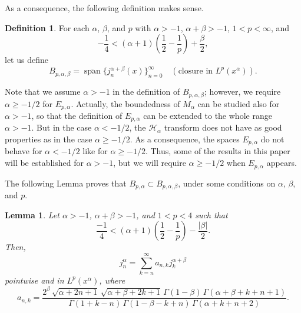 \documentclass[reqno]{amsart}
\theoremstyle{plain}
\newtheorem{Lem}{Lemma}
\theoremstyle{definition}
\newtheorem{Defn}{Definition}
\theoremstyle{remark}
\newcommand{\spa}{\operatorname{span}} %
\newcommand{\htr}{\mathcal{H}_\alpha} %
\begin{document}
As a consequence, the following definition makes sense.

\begin{Defn}
\label{defn:Bp}
For each $\alpha$, $\beta$, and $p$ with $\alpha > -1$, $\alpha + \beta > -1$,
$1< p < \infty$, and
\begin{equation*}
    -\frac14 < (\alpha+1)\left(\frac12-\frac1p\right) + \frac{\beta}2,
\end{equation*}
let us define
\begin{equation*}
	  B_{p,\alpha,\beta} = \overline{\spa} \{j_n^{\alpha+\beta}(x)\}_{n=0}^\infty
   \quad (\text{closure in } L^p(x^\alpha)).
\end{equation*}
\end{Defn}

Note that we assume $\alpha>-1$ in the definition of $B_{p,\alpha,\beta}$;
however, we require $\alpha\ge-1/2$ for $E_{p,\alpha}$. Actually, the
boundedness of $M_\alpha$ can be studied also for $\alpha>-1$, so that the
definition of $E_{p,\alpha}$ can be extended to the whole range $\alpha >
-1$. But in the case $\alpha < -1/2$, the $\htr$ transform does not have as
good properties as in the case $\alpha\ge-1/2$. As a consequence, the spaces
$E_{p,\alpha}$ do not behave for $\alpha<-1/2$ like for $\alpha\ge-1/2$. Thus,
some of the results in this paper will be established for $\alpha>-1$, but we
will require $\alpha\ge-1/2$ when $E_{p,\alpha}$ appears.

The following Lemma proves that $B_{p,\alpha} \subset B_{p,\alpha,\beta}$,
under some conditions on $\alpha$, $\beta$, and $p$.

\begin{Lem}
\label{lem:jnajna+b}
Let $\alpha>-1$, $\alpha + \beta > -1$, and $1<p<4$ such that
\begin{equation*}
    \frac{-1}4 < (\alpha+1)\left(\frac12-\frac1p\right) - \frac{|\beta|}2.
\end{equation*}
Then,
\begin{equation}
\label{ec:jnajna+b}
    j_n^\alpha = \sum_{k=n}^\infty a_{n,k} j_k^{\alpha+\beta}
\end{equation}
pointwise and in $L^p(x^\alpha)$, where
\begin{equation}
\label{ec:ank}
    a_{n,k} = \frac{2^\beta \, \sqrt{\alpha + 2n + 1} \,
        \sqrt{\alpha+\beta+2k+1} \,
        \Gamma(1-\beta) \, \Gamma(\alpha+\beta+k+n+1)}
       {\Gamma(1+k-n) \, \Gamma(1-\beta-k+n)\,
        \Gamma(\alpha+k+n+2)}.
\end{equation}
\end{Lem}
\end{document}
